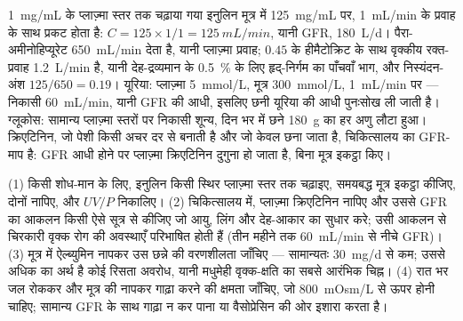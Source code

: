 \begin{example}[संख्याओं में निकासियाँ]\label{ex:b3:renal-osmoregulation:numbers}
\qty{1}{mg/mL} के प्लाज़्मा स्तर तक चढ़ाया गया इनुलिन मूत्र में
\qty{125}{mg/mL} पर, \qty{1}{mL/min} के प्रवाह के साथ प्रकट होता है:
$C = 125\times 1/1 =
\qty{125}{mL/min}$, यानी GFR, \qty{180}{L/d}। पैरा-अमीनोहिप्यूरेट
\qty{650}{mL/min} देता है, यानी प्लाज़्मा प्रवाह; $0.45$ के हीमैटोक्रिट
के साथ वृक्कीय रक्त-प्रवाह \qty{1.2}{L/min} है, यानी देह-द्रव्यमान के
\qty{0.5}{\%} के लिए हृद्-निर्गम का पाँचवाँ भाग, और निस्यंदन-अंश
$125/650 = 0.19$। यूरिया: प्लाज़्मा \qty{5}{mmol/L}, मूत्र
\qty{300}{mmol/L}, \qty{1}{mL/min} पर --- निकासी \qty{60}{mL/min},
यानी GFR की आधी, इसलिए छनी यूरिया की आधी पुनःसोख ली जाती है। ग्लूकोस:
सामान्य प्लाज़्मा स्तरों पर निकासी शून्य, दिन भर में छने \qty{180}{g}
का हर अणु लौटा हुआ। क्रिएटिनिन, जो पेशी किसी अचर दर से बनाती है और जो
केवल छना जाता है, चिकित्सालय का GFR-माप है: GFR आधी होने पर प्लाज़्मा
क्रिएटिनिन दुगुना हो जाता है, बिना मूत्र इकट्ठा किए।
\end{example}

\begin{method}[गुर्दे का प्रकार्य नापना]\label{met:b3:renal-osmoregulation:gfr}
(1) किसी शोध-मान के लिए, इनुलिन किसी स्थिर प्लाज़्मा स्तर तक चढ़ाइए,
समयबद्ध मूत्र इकट्ठा कीजिए, दोनों नापिए, और $UV/P$ निकालिए।
(2) चिकित्सालय में, प्लाज़्मा क्रिएटिनिन नापिए और उससे GFR का आकलन किसी
ऐसे सूत्र से कीजिए जो आयु, लिंग और देह-आकार का सुधार करे; उसी आकलन से
चिरकारी वृक्क रोग की अवस्थाएँ परिभाषित होती हैं (तीन महीने तक
\qty{60}{mL/min} से नीचे GFR)। (3) मूत्र में ऐल्ब्युमिन नापकर उस छन्ने
की वरणशीलता जाँचिए --- सामान्यतः \qty{30}{mg/d} से कम; उससे अधिक का
अर्थ है कोई रिसता अवरोध, यानी मधुमेही वृक्क-क्षति का सबसे आरंभिक चिह्न।
(4) रात भर जल रोककर और मूत्र की  नापकर गाढ़ा करने की क्षमता
जाँचिए, जो \qty{800}{mOsm/L} से ऊपर होनी चाहिए; सामान्य GFR के साथ
गाढ़ा न कर पाना  या वैसोप्रेसिन की ओर इशारा करता है।
\end{method}

